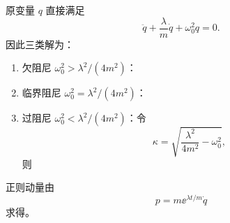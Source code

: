 \begin{question}
\begin{solution}
原变量 $q$ 直接满足
\[
  \ddot q+\frac{\lambda}{m}\dot q+\omega_0^2q=0.
\]
因此三类解为：
\begin{enumerate}
  \item 欠阻尼 $\omega_0^2>\lambda^2/(4m^2)$：
  \item 临界阻尼 $\omega_0^2=\lambda^2/(4m^2)$：
  \item 过阻尼 $\omega_0^2<\lambda^2/(4m^2)$：令
  \[
    \kappa=\sqrt{\frac{\lambda^2}{4m^2}-\omega_0^2},
  \]
  则
\end{enumerate}
正则动量由
\[
  p=m\ee^{\lambda t/m}\dot q
\]
求得。
\end{solution}

\end{question}
